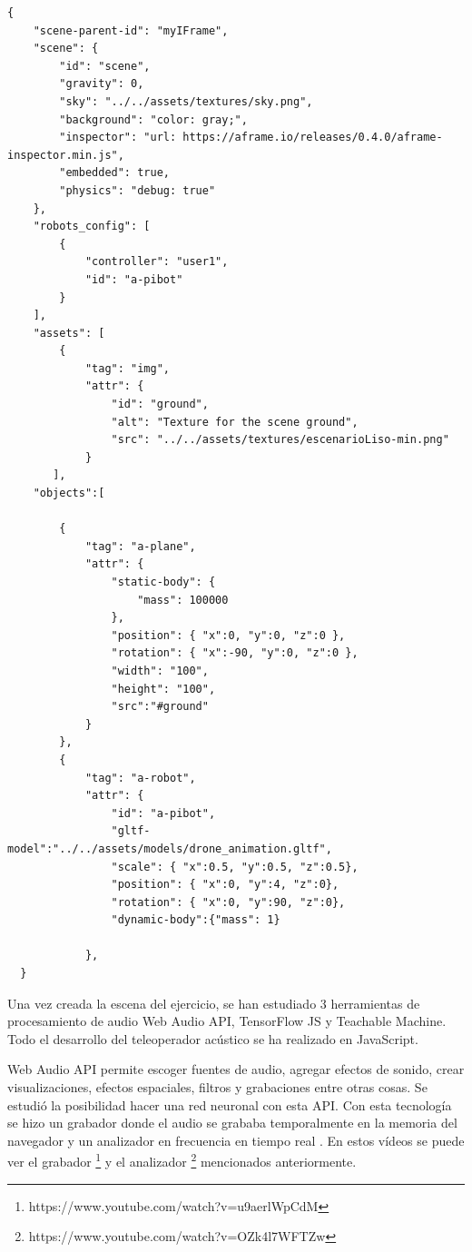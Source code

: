 \begin{lstlisting}
{
    "scene-parent-id": "myIFrame",
    "scene": {
        "id": "scene",
        "gravity": 0,
        "sky": "../../assets/textures/sky.png",
        "background": "color: gray;",
        "inspector": "url: https://aframe.io/releases/0.4.0/aframe-inspector.min.js",
        "embedded": true,
        "physics": "debug: true"
    },
    "robots_config": [
        {
            "controller": "user1",
            "id": "a-pibot"
        }
    ],
    "assets": [
        {
            "tag": "img",
            "attr": {
                "id": "ground",
                "alt": "Texture for the scene ground",
                "src": "../../assets/textures/escenarioLiso-min.png"
            }
       ],
    "objects":[
     
        {
            "tag": "a-plane",
            "attr": {
                "static-body": {
                    "mass": 100000
                },
                "position": { "x":0, "y":0, "z":0 },
                "rotation": { "x":-90, "y":0, "z":0 },
                "width": "100",
                "height": "100",
                "src":"#ground"
            }
        },
        {
            "tag": "a-robot",
            "attr": {
                "id": "a-pibot",
                "gltf-model":"../../assets/models/drone_animation.gltf",
                "scale": { "x":0.5, "y":0.5, "z":0.5},
                "position": { "x":0, "y":4, "z":0},
                "rotation": { "x":0, "y":90, "z":0},
                "dynamic-body":{"mass": 1}

            },      
  }
\end{lstlisting}


Una vez creada la escena del ejercicio, se han estudiado 3 herramientas de procesamiento de audio  Web Audio API, TensorFlow JS y Teachable Machine. Todo el desarrollo del teleoperador acústico se ha realizado en JavaScript.

Web Audio API permite escoger fuentes de audio, agregar efectos de sonido, crear visualizaciones, efectos espaciales, filtros y grabaciones entre otras cosas.
Se estudió la  posibilidad hacer una red neuronal con esta API. Con esta tecnología se hizo un grabador donde el audio se grababa temporalmente en la memoria del navegador y un analizador en frecuencia en tiempo real \cite{waa2} .  En estos vídeos se puede ver el grabador \footnote{https://www.youtube.com/watch?v=u9aerlWpCdM} y el analizador \footnote{https://www.youtube.com/watch?v=OZk4l7WFTZw} mencionados anteriormente.

